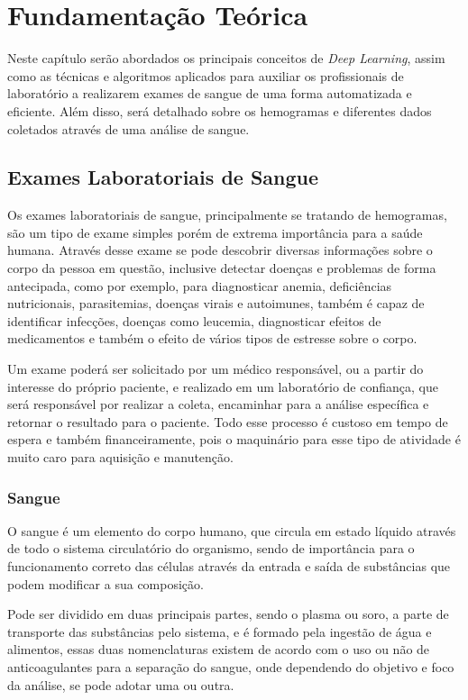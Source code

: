 

\chapter{Fundamentação Teórica}
\label{chap:fund}

Neste capítulo serão abordados os principais conceitos de \emph{Deep Learning}, assim como as técnicas e algoritmos aplicados para auxiliar os profissionais de laboratório a realizarem exames de sangue de uma forma automatizada e eficiente. Além disso, será detalhado sobre os hemogramas e diferentes dados coletados através de uma análise de sangue.

\section{Exames Laboratoriais de Sangue}
\label{sec:conceito1}
Os exames laboratoriais de sangue, principalmente se tratando de hemogramas, são um tipo de exame simples porém de extrema importância para a saúde humana. Através desse exame se pode descobrir diversas informações sobre o corpo da pessoa em questão, inclusive detectar doenças e problemas de forma antecipada, como por exemplo, para diagnosticar anemia, deficiências nutricionais, parasitemias, doenças virais e autoimunes, também é capaz de identificar infecções, doenças como leucemia, diagnosticar efeitos de medicamentos e também o efeito de vários tipos de estresse sobre o corpo. \cite{bloodbook}

Um exame poderá ser solicitado por um médico responsável, ou a partir do interesse do próprio paciente, e realizado em um laboratório de confiança, que será responsável por realizar a coleta, encaminhar para a análise específica e retornar o resultado para o paciente. Todo esse processo é custoso em tempo de espera e também financeiramente, pois o maquinário para esse tipo de atividade é muito caro para aquisição e manutenção.

\subsection{Sangue}
O sangue é um elemento do corpo humano, que circula em estado líquido através de todo o sistema circulatório do organismo, sendo de importância para o funcionamento correto das células através da entrada e saída de substâncias que podem modificar a sua composição.

Pode ser dividido em duas principais partes, sendo o plasma ou soro, a parte de transporte das substâncias pelo sistema, e é formado pela ingestão de água e alimentos, essas duas nomenclaturas existem de acordo com o uso ou não de anticoagulantes para a separação do sangue, onde dependendo do objetivo e foco da análise, se pode adotar uma ou outra.

